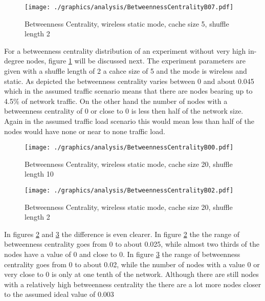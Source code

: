 \begin{figure}
	\texttt{[image: ./graphics/analysis/BetweennessCentralityB07.pdf]}
	\caption{Betweenness Centrality, wireless static mode, cache size 5, shuffle
	length 2}
	\label{fig:betweennessB07}
\end{figure}


For a betweenness centrality distribution of an experiment without
very high in-degree nodes, figure \ref{fig:betweennessB07} will be discussed
next. The experiment parameters are given with a shuffle length of 2 a cahce
size of 5 and the mode is wireless and static. As depicted the betweenness
centrality varies between 0 and about 0.045 which in the assumed traffic
scenario means that there are nodes bearing up to 4.5\% of network traffic. On
the other hand the number of nodes with a betweenness centrality of 0 or close
to 0 is less then half of the network size. Again in the assumed traffic load
scenario this would mean less than half of the nodes would have none or near to
none traffic load. \\

\begin{figure}
	\texttt{[image: ./graphics/analysis/BetweennessCentralityB00.pdf]}
	\caption{Betweenness Centrality, wireless static mode, cache size 20, shuffle
	length 10}
	\label{fig:betweennessB00}
\end{figure}

\begin{figure}
	\texttt{[image: ./graphics/analysis/BetweennessCentralityB02.pdf]}
	\caption{Betweenness Centrality, wireless static mode, cache size 20, shuffle
	length 2}
	\label{fig:betweennessB02}
\end{figure}

In figures \ref{fig:betweennessB00} and \ref{fig:betweennessB02} the difference
is even clearer. In figure \ref{fig:betweennessB00} the the range of betweenness
centrality goes from 0 to about 0.025, while almost two thirds of the nodes
have a value of 0 and close to 0. In figure \ref{fig:betweennessB02} the range
of betweenness centrality goes from 0 to about 0.02, while the number of nodes
with a value 0 or very close to 0 is only at one tenth of the network. Although
there are still nodes with a relatively high betweenness centrality the there
are a lot more nodes closer to the assumed ideal value of 0.003

